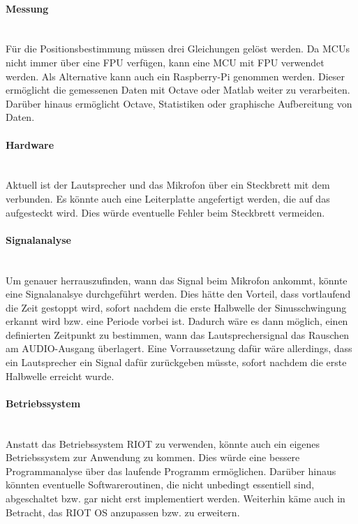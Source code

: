 \paragraph{Messung}\mbox{}\\
Für die Positionsbestimmung müssen drei Gleichungen gelöst werden. Da MCUs nicht immer über eine FPU verfügen, kann eine MCU mit FPU verwendet werden. Als Alternative kann auch ein Raspberry-Pi genommen werden. Dieser ermöglicht die gemessenen Daten mit Octave oder Matlab weiter zu verarbeiten. Darüber hinaus ermöglicht Octave, Statistiken oder graphische Aufbereitung von Daten.

\paragraph{Hardware}\mbox{}\\
Aktuell ist der Lautsprecher und das Mikrofon über ein Steckbrett mit dem \board \platz verbunden. Es könnte auch eine Leiterplatte angefertigt werden, die auf das \board \platz aufgesteckt wird. Dies würde eventuelle Fehler beim Steckbrett vermeiden.  

\paragraph{Signalanalyse}\mbox{}\\
Um genauer herrauszufinden, wann das Signal beim Mikrofon ankommt, könnte eine Signalanalsye durchgeführt werden. Dies hätte den Vorteil, dass vortlaufend die Zeit gestoppt wird, sofort nachdem die erste Halbwelle der Sinusschwingung erkannt wird bzw. eine Periode vorbei ist. Dadurch wäre es dann möglich, einen definierten Zeitpunkt zu bestimmen, wann das Lautsprechersignal das Rauschen am \si{AUDIO}-Ausgang überlagert. Eine Vorraussetzung dafür wäre allerdings, dass ein Lautsprecher ein Signal dafür zurückgeben müsste, sofort nachdem die erste Halbwelle erreicht wurde.

\paragraph{Betriebssystem}\mbox{}\\
Anstatt das Betriebssystem RIOT zu verwenden, könnte auch ein eigenes Betriebssystem zur Anwendung zu kommen. Dies würde eine bessere Programmanalyse über das laufende Programm ermöglichen. Darüber hinaus könnten eventuelle Softwareroutinen, die nicht unbedingt essentiell sind, abgeschaltet bzw. gar nicht erst implementiert werden. Weiterhin käme auch in Betracht, das RIOT OS anzupassen bzw. zu erweitern.





